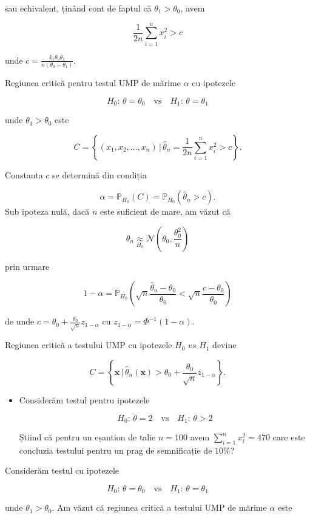 \documentclass[]{article}
\newenvironment{frshaded*}{%
  \def\FrameCommand{\fboxrule=\FrameRule\fboxsep=\FrameSep \fcolorbox{framecolor}{shadecolor1}}%
  \MakeFramed {\advance\hsize-\width \FrameRestore}}%
{\endMakeFramed}
\newenvironment{rmdblock}[1]
  {\begin{frshaded*}
  \begin{itemize}
  \renewcommand{\labelitemi}{
    \raisebox{-.7\height}[0pt][0pt]{
      {\setkeys{Gin}{width=2em,keepaspectratio}\texttt{[image: images/icons/\#1]}}
    }
  }
  \item
  }
  {
  \end{itemize}
  \end{frshaded*}
  }
\newenvironment{rmdexercise}
  {\begin{rmdblock}{exercise}}
  {\end{rmdblock}}
\begin{document}
sau echivalent, ținând cont de faptul că \(\theta_1>\theta_0\), avem

\[
  \frac{1}{2n}\sum_{i = 1}^{n}x_i^2 > c
\]

unde \(c = \frac{k_1 \theta_0 \theta_1}{n(\theta_0 - \theta_1)}\).

Regiunea critică pentru testul UMP de mărime \(\alpha\) cu ipotezele

\[
  H_0:\, \theta = \theta_0 \quad \text{vs}\quad H_1:\, \theta = \theta_1
\]

unde \(\theta_1>\theta_0\) este

\[
  C = \left\{(x_1,x_2,\ldots,x_n)\,|\,\hat{\theta}_n = \frac{1}{2n}\sum_{i = 1}^{n}x_i^2 > c\right\}.
\]

Constanta \(c\) se determină din condiția

\[
  \alpha = \mathbb{P}_{H_0}(C) = \mathbb{P}_{H_0}(\hat{\theta}_n > c).
\] Sub ipoteza nulă, dacă \(n\) este suficient de mare, am văzut că

\[
  \hat{\theta}_n \underset{H_0}{\approx} \mathcal{N}\left(\theta_0, \frac{\theta_0^2}{n}\right)
\]

prin urmare

\[
  1-\alpha = \mathbb{P}_{H_0}\left(\sqrt{n}\frac{\hat{\theta}_n - \theta_0}{\theta_0}<\sqrt{n}\frac{c - \theta_0}{\theta_0}\right)
\]

de unde \(c = \theta_0 + \frac{\theta_0}{\sqrt{n}}z_{1-\alpha}\) cu
\(z_{1-\alpha} = \Phi^{-1}(1-\alpha)\).

Regiunea critică a testului UMP cu ipotezele \(H_0\,\,vs\,\,H_1\) devine

\[
  C = \left\{\mathbf{x}\,|\,\hat{\theta}_n(\mathbf{x}) > \theta_0 + \frac{\theta_0}{\sqrt{n}}z_{1-\alpha}\right\}.
\]

\begin{rmdexercise}
Considerăm testul pentru ipotezele

\[
  H_0:\, \theta = 2 \quad \text{vs}\quad H_1:\, \theta > 2
\]

Știind că pentru un eșantion de talie \(n = 100\) avem
\(\sum_{i = 1}^{n}x_i^2 = 470\) care este concluzia testului pentru un
prag de semnificație de \(10\%\)?
\end{rmdexercise}

Considerăm testul cu ipotezele

\[
  H_0:\, \theta = \theta_0 \quad \text{vs}\quad H_1:\, \theta = \theta_1
\]

unde \(\theta_1>\theta_0\). Am văzut că regiunea critică a testului UMP
de mărime \(\alpha\) este
\end{document}
